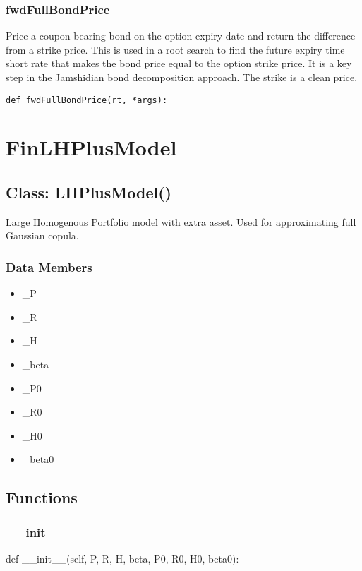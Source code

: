 \documentclass[twoside,11pt]{book}
\begin{document}
\subsubsection*{{\bf fwdFullBondPrice}}
Price a coupon bearing bond on the option expiry date and return the difference from a strike price. This is used in a root search to find the future expiry time short rate that makes the bond price equal to the option strike price. It is a key step in the Jamshidian bond decomposition approach. The strike is a clean price.  

\begin{lstlisting}
def fwdFullBondPrice(rt, *args):
\end{lstlisting}

\newpage
\section{FinLHPlusModel}

\subsection*{Class: LHPlusModel()}
Large Homogenous Portfolio model with extra asset. Used for approximating full Gaussian copula.  

\subsubsection*{Data Members}
\begin{itemize}
\item{\_P}
\item{\_R}
\item{\_H}
\item{\_beta}
\item{\_P0}
\item{\_R0}
\item{\_H0}
\item{\_beta0}
\end{itemize}

\subsection*{Functions}

\subsubsection*{{\bf \_\_init\_\_}}
def \_\_init\_\_(self, P, R, H, beta, P0, R0, H0, beta0): 
\end{document}
